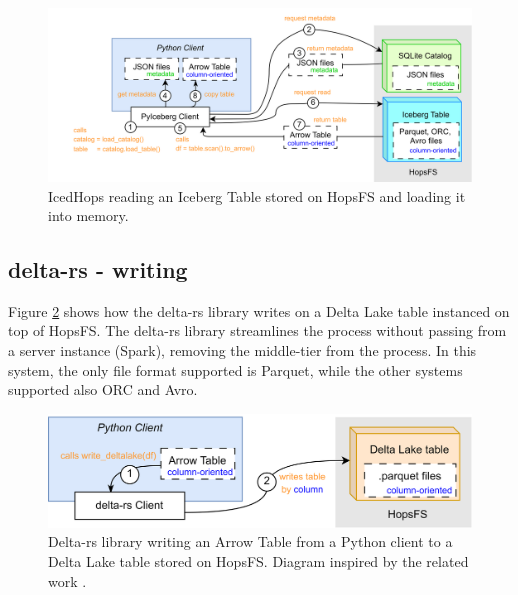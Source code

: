 \begin{figure}
    \begin{center}
      \includegraphics[width=\textwidth]{figures/2-background_and_related_work/iceberg_read.png}
    \end{center}
    \caption[IcedHops - read process]{IcedHops reading an Iceberg Table stored on \gls{HopsFS} and loading it into memory.}
    \label{fig:iceberg_read}
\end{figure}



\subsection{delta-rs - writing}
\label{subsec:back_sys_delta_write}

Figure \ref{fig:delta_write} shows how the delta-rs library writes on a Delta Lake table instanced on top of \gls{HopsFS}. The delta-rs library streamlines the process without passing from a server instance (Spark), removing the middle-tier from the process. In this system, the only file format supported is Parquet, while the other systems supported also ORC and Avro.

\begin{figure}
    \begin{center}
      \includegraphics[width=\textwidth]{figures/2-background_and_related_work/delta_write.png}
    \end{center}
    \caption[delta-rs - write process]{Delta-rs library writing an Arrow Table from a Python client to a Delta Lake table stored on \gls{HopsFS}. Diagram inspired by the related work \cite{manfrediReducingReadWrite2024}.}
    \label{fig:delta_write}
\end{figure}




